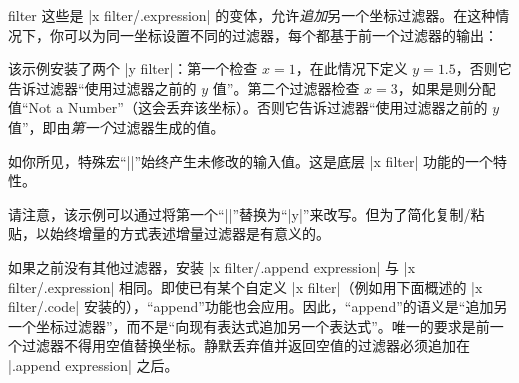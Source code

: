 \begin{pgfplotsxyappendexpressionkeylist}{\x\space filter}
    这些是 |x filter/.expression| 的变体，允许\emph{追加}另一个坐标过滤器。在这种情况下，你可以为同一坐标设置不同的过滤器，每个都基于前一个过滤器的输出：
\begin{codeexample}[]
\end{codeexample}
    该示例安装了两个 |y filter|：第一个检查 $x = 1$，在此情况下定义 $y=1.5$，否则它告诉过滤器“使用过滤器之前的 $y$ 值”。第二个过滤器检查 $x = 3$，如果是则分配值“Not a Number”（这会丢弃该坐标）。否则它告诉过滤器“使用过滤器之前的 $y$ 值”，即由\emph{第一个}过滤器生成的值。

    如你所见，特殊宏“|\pgfmathresult|”始终产生未修改的输入值。这是底层 |x filter| 功能的一个特性。

    请注意，该示例可以通过将第一个“|\pgfmathresult|”替换为“|y|”来改写。但为了简化复制/粘贴，以始终增量的方式表述增量过滤器是有意义的。

    如果之前没有其他过滤器，安装 |x filter/.append expression| 与 |x filter/.expression| 相同。即使已有某个自定义 |x filter|（例如用下面概述的 |x filter/.code| 安装的），“append”功能也会应用。因此，“append”的语义是“追加另一个坐标过滤器”，而不是“向现有表达式追加另一个表达式”。唯一的要求是前一个过滤器不得用空值替换坐标。静默丢弃值并返回空值的过滤器必须追加在 |.append expression| 之后。
\end{pgfplotsxyappendexpressionkeylist}

